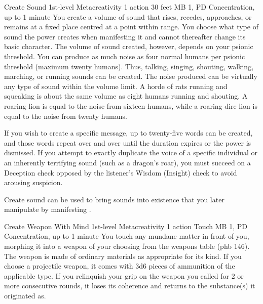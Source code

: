 \DndPowerHeader%
  {Create Sound}
  {1st-level Metacreativity}
  {1 action}
  {30 feet}
  {MB 1, PD \lvlone}
  {Concentration, up to 1 minute}
  You create a volume of sound that rises, recedes, approaches,
  or remains at a fixed place centred at a point within range.
  You choose what type of sound the power creates when manifesting it
  and cannot thereafter change its basic character.
  The volume of sound created, however, depends on your psionic threshold.
  You can produce as much noise as four normal humans per psionic threshold
  (maximum twenty humans).
  Thus, talking, singing, shouting, walking,
  marching, or running sounds can be created.
  The noise produced can be virtually any type of sound within the volume limit.
  A horde of rats running and squeaking is about the same volume as eight humans
  running and shouting.
  A roaring lion is equal to the noise from sixteen humans,
  while a roaring dire lion is equal to the noise from twenty humans.

  If you wish to create a specific message,
  up to twenty-five words can be created,
  and those words repeat over and over until the duration expires
  or the power is dismissed.
  If you attempt to exactly duplicate the voice of a specific individual
  or an inherently terrifying sound
  (such as a dragon's roar),
  you must succeed on a Deception check opposed
  by the listener's Wisdom (Insight) check to avoid arousing suspicion.
  
  Create sound can be used to bring sounds into existence that you later
  manipulate by manifesting .

\DndPowerHeader%
  {Create Weapon With Mind}
  {1st-level Metacreativity}
  {1 action}
  {Touch}
  {MB 1, PD \lvlone}
  {Concentration, up to 1 minute}
  You touch any mundane matter in front of you,
  morphing it into a weapon of your choosing
  from the weapons table (phb 146).
  The weapon is made of ordinary materials
  as appropriate for its kind.
  If you choose a projectile weapon,
  it comes with 3d6 pieces of ammunition
  of the applicable type.
  If you relinquish your grip on the weapon you called
  for 2 or more consecutive rounds,
  it loses its coherence and returns to the substance(s)
  it originated as.

